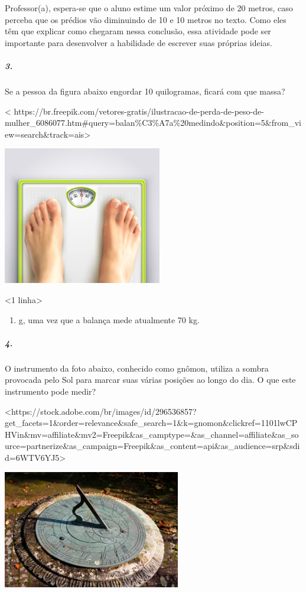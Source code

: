 Professor(a), espera-se que o aluno estime um valor próximo de 20
metros, caso perceba que os prédios vão diminuindo de 10 e 10 metros no
texto. Como eles têm que explicar como chegaram nessa conclusão, essa
atividade pode ser importante para desenvolver a habilidade de escrever
suas próprias ideias.

\subparagraph{3.}\label{section-30}

Se a pessoa da figura abaixo engordar 10 quilogramas, ficará com que
massa?

\textless{}
https://br.freepik.com/vetores-gratis/ilustracao-de-perda-de-peso-de-mulher\_6086077.htm\#query=balan\%C3\%A7a\%20medindo\&position=5\&from\_view=search\&track=ais\textgreater{}

\includegraphics[width=2.72917in,height=2.37665in]{media/image44.jpeg}

\textless{}1 linha\textgreater{}

\begin{enumerate}
\def\labelenumi{\arabic{enumi}.}
\setcounter{enumi}{79}
\item
  g, uma vez que a balança mede atualmente 70 kg.
\end{enumerate}

\subparagraph{4.}\label{section-31}

O instrumento da foto abaixo, conhecido como gnômon, utiliza a sombra
provocada pelo Sol para marcar suas várias posições ao longo do dia. O
que este instrumento pode medir?

\textless{}https://stock.adobe.com/br/images/id/296536857?get\_facets=1\&order=relevance\&safe\_search=1\&k=gnomon\&clickref=1101lwCPHVin\&mv=affiliate\&mv2=Freepik\&as\_camptype=\&as\_channel=affiliate\&as\_source=partnerize\&as\_campaign=Freepik\&as\_content=api\&as\_audience=srp\&sdid=6WTV6YJ5\textgreater{}

\includegraphics[width=3.05208in,height=2.03472in]{media/image45.jpeg}

